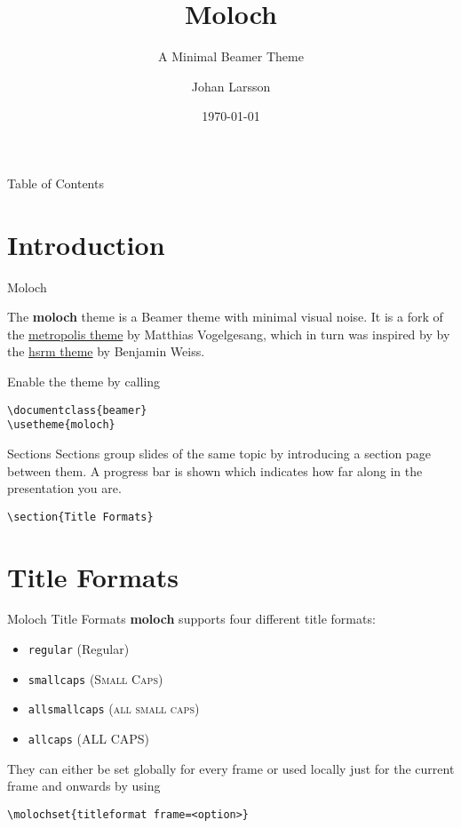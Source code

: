 \documentclass[10pt]{beamer}
\title{Moloch}
\subtitle{A Minimal Beamer Theme}
\date{\today}
\author{Johan Larsson}
\institute{The Department of Statistics, Lund University}
\newcommand{\themename}{\textbf{moloch}\xspace}
\begin{document}
\maketitle

\begin{frame}{Table of Contents}
  \tableofcontents[hideallsubsections]
\end{frame}

\section{Introduction}

\begin{frame}[fragile]{Moloch}

  The \themename theme is a Beamer theme with minimal visual noise. It is a fork of the
  \href{https://github.com/matze/mtheme}{metropolis theme} by Matthias Vogelgesang, which in
  turn was inspired by by the \href{https://github.com/hsrmbeamertheme/hsrmbeamertheme}{hsrm
    theme} by Benjamin Weiss. \medskip

  Enable the theme by calling
  \begin{verbatim}\documentclass{beamer}
\usetheme{moloch}\end{verbatim}
\end{frame}
\begin{frame}[fragile]{Sections}
  Sections group slides of the same topic by introducing a section page between them. A progress bar is shown which indicates how far along in the presentation you are.

  \begin{verbatim}\section{Title Formats}\end{verbatim}
\end{frame}

\section{Title Formats}

\begin{frame}[fragile]{Moloch Title Formats}
  \themename supports four different title formats:
  \begin{itemize}
    \item \texttt{regular} (Regular)
    \item \texttt{smallcaps} (\textsc{Small Caps})
    \item \texttt{allsmallcaps} (\textsc{all small caps})
    \item \texttt{allcaps} (ALL CAPS)
  \end{itemize}

  They can either be set globally for every frame or used locally just for the current frame
  and onwards by using
  \begin{verbatim}\molochset{titleformat frame=<option>}\end{verbatim}
\end{frame}
\end{document}
